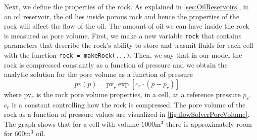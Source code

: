 Next, we define the properties of the rock. As explained in \autoref{sec:OilReservoirs}, in an oil reservoir, the oil lies inside porous rock and hence the properties of the rock will affect the flow of the oil. The amount of oil we can have inside the rock is measured as pore volume. First, we make a new variable \texttt{rock} that contains parameters that describe the rock's ability to store and trasmit fluids for each cell with the function \texttt{rock = makeRock(...)}. Then, we say that in our model the rock is compressed constantly as a function of pressure and we obtain the analytic solution for the pore volume as a function of pressure
\begin{equation}
    pv(p) = \text{pv}_r \exp[c_r\cdot(p-p_r)],
    \label{eq:poreVolume}
\end{equation}
where pv$_r$ is the rock pore volume properties, in a cell, at a reference pressure $p_r$. $c_r$ is a constant controlling how the rock is compressed. The pore volume of the rock as a function of pressure values are visualized in \autoref{fig:flowSolverPoreVolume}. The graph shows that for a cell with volume $1000\text{m}^3$ there is approximately room for $600\text{m}^3$ oil.

